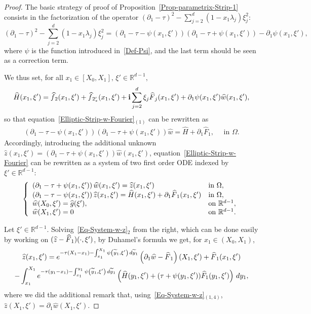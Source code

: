 \documentclass[AHL,Unicode,longabstracts]{cedram}
\newcommand*\R{\mathbb{R}}
\renewcommand{\i}{\mathbf{i}}
\renewcommand{\tilde}{\widetilde}
\renewcommand{\hat}{\widehat}
\let\oldtilde\tilde
\renewcommand*{\tilde}[1]{\mathchoice{\widetilde{#1}}{\widetilde{#1}}{\oldtilde{#1}}{\oldtilde{#1}}}
\let\oldhat\hat
\renewcommand*{\hat}[1]{\mathchoice{\widehat{#1}}{\widehat{#1}}{\oldhat{#1}}{\oldhat{#1}}}
\begin{document}
\begin{proof}
The basic strategy of proof of Proposition~\ref{Prop-parametrix-Strip-1} consists in the factorization of the operator $(\partial_1 - \tau)^2 - \sum_{j = 2}^d (1- x_1 \lambda_j) \xi_j^2$:
\[
(\partial_1 - \tau)^2 - \sum_{j = 2}^d (1- x_1 \lambda_j) \xi_j^2 =
\left(
\partial_1 - \tau- \psi(x_1, \xi')
\right)
\left(
\partial_1 - \tau + \psi(x_1, \xi')
\right) - \partial_1 \psi(x_1, \xi'),
\]
where $\psi$ is the function introduced in~\eqref{Def-Psi}, and the last term should be seen as a correction term.

We thus set, for all $ x_1 \in [X_0, X_1], \, \xi' \in \R^{d-1}, $
\[
\widehat H (x_1, \xi') = \hat f_2(x_1, \xi') + \hat f_{2_*'}(x_1, \xi') + \i \sum_{j=2}^d \xi_j \hat F_j(x_1, \xi') + \partial_1 \psi(x_1, \xi') \widehat w(x_1, \xi'),
\]
so that equation~\eqref{Elliptic-Strip-w-Fourier}$_{(1)}$ can be rewritten as
\begin{align*}
\left(
\partial_1 - \tau- \psi(x_1, \xi')
\right)
\left(
\partial_1 - \tau + \psi(x_1, \xi')
\right)
\widehat{w} =
\widehat{H} + \partial_1 \widehat F_1, \quad \text{ in } \Omega.
\end{align*}
Accordingly, introducing the additional unknown $\widehat{z}(x_1, \xi') \!\! =\!\!(\partial_1 - \tau + \psi(x_1, \xi')) \widehat w(x_1,\xi')$, equation~\eqref{Elliptic-Strip-w-Fourier} can be rewritten as a system of two first order ODE indexed by $\xi' \in \R^{d-1}$:
\begin{equation}\label{Eq-System-w-z}
\left\{
\begin{array}{ll}
\left(\partial_1-\tau+\psi(x_1,\xi') \right) \widehat{w}(x_1,\xi')=\widehat{z}(x_1,\xi') &\text{in } \Omega,
\\
\left(\partial_1-\tau-\psi(x_1,\xi') \right)\widehat{z}(x_1,\xi')=\widehat{H}(x_1,\xi') + \partial_1 \hat F_1(x_1, \xi') & \text{in } \Omega,
\\
\widehat{w}(X_0,\xi')= \widehat{g}(\xi'), &\text{on } \R^{d-1},
\\
\widehat{w}(X_1,\xi')= 0 &\text{on } \R^{d-1}.
\end{array}
\right.
\end{equation}

Let $\xi' \in \R^{d-1}$. Solving~\eqref{Eq-System-w-z}$_{2}$ from the right, which can be done easily by working on $(\widehat z - \hat F_1)(\cdot, \xi')$, by Duhamel’s formula we get, for $x_1 \in (X_0,X_1)$,
\begin{multline}\label{Explicit-z}
\widehat{z}(x_1, \xi') = e^{-\tau (X_1 -x_1)- \int_{x_1}^{X_1} \psi\left(\tilde{y}_1,\xi'\right) \, d \tilde{y}_1} \left(\partial_1 \widehat w- \hat F_1\right)(X_1, \xi') +
\hat F_1(x_1, \xi')
\\
-\int_{x_1}^{X_1} e^{-\tau (y_1-x_1)-\int_{x_1}^{y_1} \psi\left(\tilde{y}_1,\xi'\right) \, d \tilde{y}_1} \left(\widehat{H}(y_1, \xi') + (\tau + \psi(y_1, \xi')) \widehat F_1(y_1, \xi')\right) \, d y_1,
\end{multline}
where we did the additional remark that, using~\eqref{Eq-System-w-z}$_{(1,4)}$, $\widehat z(X_1, \xi') = \partial_1 \widehat w (X_1, \xi')$.


\end{proof}
\end{document}
